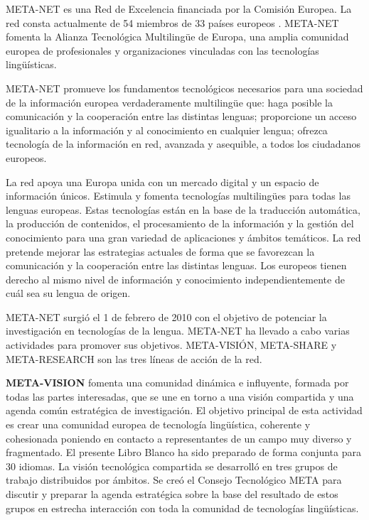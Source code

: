 \vspace*{-8mm}
\begin{multicols}{2}
   META-NET es una Red de Excelencia financiada por la Comisión Europea. La red consta actualmente de 54 miembros de 33 países europeos \cite{rehm2011}. META-NET fomenta la Alianza Tecnológica Multilingüe de Europa, una amplia comunidad europea de profesionales y organizaciones vinculadas con las tecnologías lingüísticas.
  
META-NET promueve los fundamentos tecnológicos necesarios para una sociedad de la información europea verdaderamente multilingüe que: haga posible la comunicación y la cooperación entre las distintas lenguas; proporcione un acceso igualitario a la información y al conocimiento en cualquier lengua; ofrezca tecnología de la información en red, avanzada y asequible, a todos los ciudadanos europeos.

La red apoya una Europa unida con un mercado digital y un espacio de información únicos. Estimula y fomenta tecnologías multilingües para todas las lenguas europeas. Estas tecnologías están en la base de la traducción automática, la producción de contenidos, el procesamiento de la información y la gestión del conocimiento para una gran variedad de aplicaciones y ámbitos temáticos. La red pretende mejorar las estrategias actuales de forma que se favorezcan la comunicación y la cooperación entre las distintas lenguas. Los europeos tienen derecho al mismo nivel de información y conocimiento independientemente de cuál sea su lengua de origen.

META-NET surgió el 1 de febrero de 2010 con el objetivo de potenciar la investigación en tecnologías de la lengua. META-NET ha llevado a cabo varias actividades para promover sus objetivos. META-VISIÓN, META-SHARE y META-RESEARCH son las tres líneas de acción de la red.
 
\textbf{META-VISION} fomenta una comunidad dinámica e influyente, formada por todas las partes interesadas, que se une en torno a una visión compartida y una agenda común estratégica de investigación. El objetivo principal de esta actividad es crear una comunidad europea de tecnología lingüística, coherente y cohesionada poniendo en contacto a representantes de un campo muy diverso y fragmentado. El presente Libro Blanco ha sido preparado de forma conjunta para 30 idiomas. La visión tecnológica compartida se desarrolló en tres grupos de trabajo distribuidos por ámbitos. Se creó el Consejo Tecnológico META para discutir y preparar la agenda estratégica sobre la base del resultado de estos grupos en estrecha interacción con toda la comunidad de tecnologías lingüísticas.


\end{multicols}
